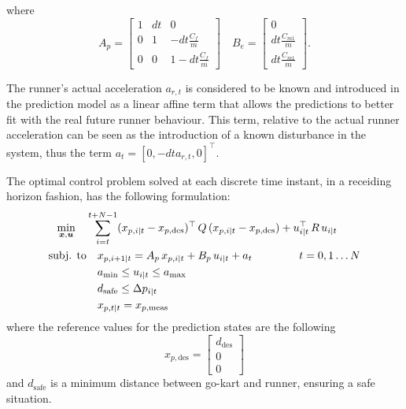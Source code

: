 \documentclass[a4paper,12pt,oneside]{book}
\begin{document}
where
\begin{equation}
    A_p =
        \begin{bmatrix}
            1 & dt & 0 \\
            0 & 1 & -dt\frac{C_f}{m} \\
            0 & 0 & 1-dt\frac{C_f}{m}
        \end{bmatrix}
    \quad
    B_e = 
        \begin{bmatrix}
            0 \\
            dt \frac{C_{m1}}{m} \\
            dt \frac{C_{m1}}{m}
        \end{bmatrix}.
\label{Prediction_matrices}
\end{equation}

The runner's actual acceleration $a_{r,t}$ is considered to be known and introduced in the prediction model as a linear affine term that allows the predictions to better fit with the real future runner behaviour.
This term, relative to the actual runner acceleration can be seen as the introduction of a known disturbance in the system, thus the term $a_t = [0, -dt a_{r,t}, 0]^\top$.

\bigskip
The optimal control problem solved at each discrete time instant, in a receiding horizon fashion, has the following formulation:
\begin{equation}
\begin{alignedat}{2}
	\min_{\substack{\boldsymbol{x}, \boldsymbol{u}}}\quad &\sum_{i=t}^{t+N-1} (x_{p,i|t} - x_{p,\text{des}}) ^\top \, Q \, (x_{p,i|t} - x_{p,\text{des}}) +  u_{i|t}^\top \, R \, u_{i|t} &&   \\
	\text{subj. to} & \quad x_{p,i+1|t}  = A_p \, x_{p,i|t} + B_p \, u_{i|t} + a_t  \hspace{1.5cm} t = 0, 1 \ldots N && \\
    &\quad a_{\text{min}} \leq u_{i|t} \leq a_{\text{max}}&& \\
    &\quad d_{\text{safe}}\leq \Delta p_{i|t} &&  \\
    &\quad x_{p,t|t} = x_{p,\text{meas}} &&
\end{alignedat}
\label{MPC_formulation}
\end{equation}
where the reference values for the prediction states are the following
\begin{equation}
    x_{p,\text{des}} =
    \begin{bmatrix}
        d_{\text{des}}  \\
        0 \\
        0
    \end{bmatrix}
\end{equation}
and $d_{\text{safe}}$ is a minimum distance between go-kart and runner, ensuring a safe situation.
\end{document}
